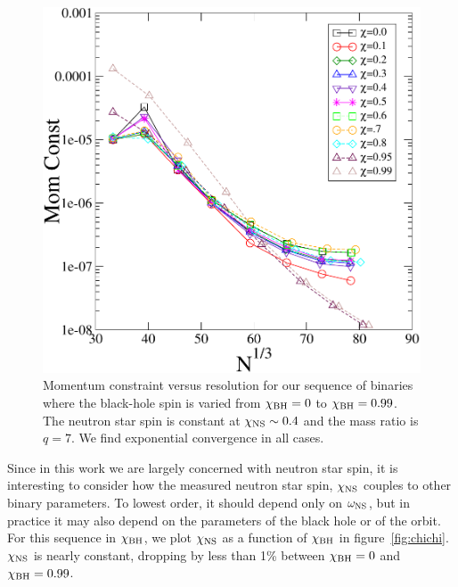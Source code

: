\begin{figure}
\includegraphics[width=0.95\columnwidth]{chap4/chiSeqMom}
\caption[Momentum constraints for the sequence in $\chi_{\rm BH}$.]{\label{fig:chiSeqMom} Momentum constraint versus resolution for our sequence of binaries where the black-hole spin is varied from $\chi_{\rm BH}=0$ to $\chi_{\rm BH}=0.99$. The neutron star spin is constant at $\chi_{\rm NS}\sim 0.4$ and the mass ratio is $q=7$. We find exponential convergence in all cases.}
\end{figure}

Since in this work we are largely concerned with neutron star spin, it
is interesting to consider how the measured neutron star spin,
$\chi_{\rm NS}$ couples to other binary parameters. To lowest order,
it should depend only on $\omega_{\rm NS}$, but in practice it may
also depend on the parameters of the black hole or of the orbit. For this sequence in
$\chi_{\rm BH}$, we plot $\chi_{\rm NS}$ as a function of $\chi_{\rm
  BH}$ in figure~\ref{fig:chichi}. $\chi_{\rm NS}$ is nearly constant,
dropping by less than 1\% between $\chi_{\rm BH}=0$ and $\chi_{\rm BH}=0.99$.

